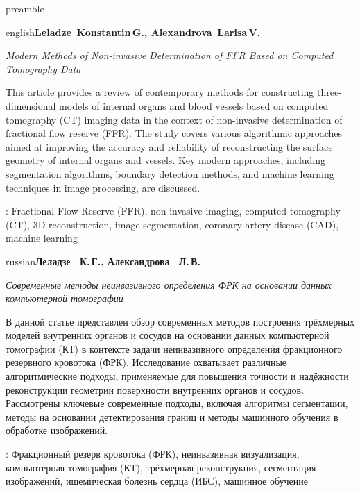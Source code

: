  {preamble}\fancyhead {}\fancyfoot {}
\par \noindent \textbf {}\par \begin {otherlanguage*}{english}\makeatletter \textbf {Leladze \,Konstantin\unhbox \voidb@x \nobreak \,G.\unskip {}, \ignorespaces Alexandrova \,Larisa\unhbox \voidb@x \nobreak \,V.}\makeatother \par \textit {Modern Methods of Non-invasive Determination of FFR Based on Computed Tomography Data}\par This article provides a review of contemporary methods for constructing three-dimensional models of internal organs and blood vessels based on computed tomography (CT) imaging data in the context of non-invasive determination of fractional flow reserve (FFR). The study covers various algorithmic approaches aimed at improving the accuracy and reliability of reconstructing the surface geometry of internal organs and vessels. Key modern approaches, including segmentation algorithms, boundary detection methods, and machine learning techniques in image processing, are discussed. \par \keywordsname : Fractional Flow Reserve (FFR), non-invasive imaging, computed tomography (CT), 3D reconstruction, image segmentation, coronary artery disease (CAD), machine learning \end {otherlanguage*}\par \par \medskip 
\par \begin {otherlanguage*}{russian}\makeatletter \textbf {Леладзе ~К.\unhbox \voidb@x \nobreak \,Г.\unskip {}, \ignorespaces Александрова ~Л.\unhbox \voidb@x \nobreak \,В.}\makeatother \par \textit {Современные методы неинвазивного определения ФРК на основании данных компьютерной томографии}\par В данной статье представлен обзор современных методов построения трёхмерных моделей внутренних органов и сосудов на основании данных компьютерной томографии (КТ) в контексте задачи неинвазивного определения фракционного резервного кровотока (ФРК). Исследование охватывает различные алгоритмические подходы, применяемые для повышения точности и надёжности реконструкции геометрии поверхности внутренних органов и сосудов. Рассмотрены ключевые современные подходы, включая алгоритмы сегментации, методы на основании детектирования границ и методы машинного обучения в обработке изображений. \par \keywordsname : Фракционный резерв кровотока (ФРК), неинвазивная визуализация, компьютерная томография (КТ), трёхмерная реконструкция, сегментация изображений, ишемическая болезнь сердца (ИБС), машинное обучение \par \end {otherlanguage*}\par \vspace \bigskipamount 
